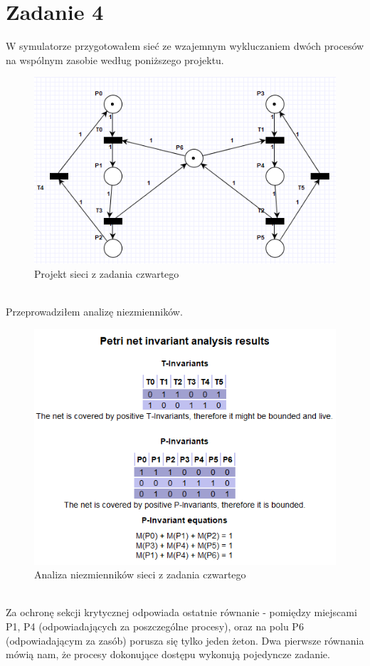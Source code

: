\documentclass{article}
\begin{document}
    \section{Zadanie 4}
        W symulatorze przygotowałem sieć ze wzajemnym wykluczaniem dwóch procesów na wspólnym zasobie według poniższego projektu.
        \begin{figure}[h!]
            \centering
            \includegraphics[width=13cm]{lab6/n4.png}
            \caption{Projekt sieci z zadania czwartego}
        \end{figure}\\
        \FloatBarrier
        Przeprowadziłem analizę niezmienników. 
        \begin{figure}[h!]
            \centering
            \includegraphics[width=13cm]{lab6/n4_1.png}
            \caption{Analiza niezmienników sieci z zadania czwartego}
        \end{figure}\\
        \FloatBarrier
        Za ochronę sekcji krytycznej odpowiada ostatnie równanie - pomiędzy miejscami P1, P4 (odpowiadających za poszczególne procesy), oraz na polu P6 (odpowiadającym za zasób) porusza się tylko jeden żeton. Dwa pierwsze równania mówią nam, że procesy dokonujące dostępu wykonują pojedyncze zadanie.
\end{document}
